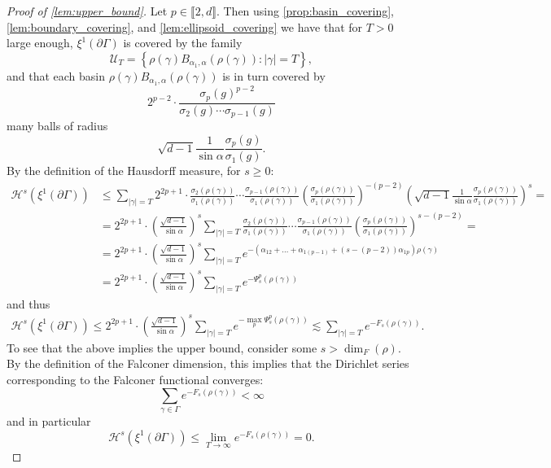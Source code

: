 \documentclass{report}
\begin{document}
\begin{proof}[Proof of \cref{lem:upper_bound}]
Let $p \in \llbracket 2, d \rrbracket$.
Then using \cref{prop:basin_covering}, \cref{lem:boundary_covering}, and \cref{lem:ellipsoid_covering} we have that for $T>0$ large enough, $\xi^1(\partial \Gamma)$ is covered by the family
\[
    \mathcal U_T = \left\{ \rho(\gamma) B_{\alpha_1, \alpha}(\rho(\gamma)) : |\gamma| = T \right\},
\]
and that each basin $\rho(\gamma) B_{\alpha_1, \alpha}(\rho(\gamma))$ is in turn covered by
\[
    2^{p-2} \cdot \frac{\sigma_p(g)^{p-2}}{\sigma_2(g) \cdots \sigma_{p-1}(g)}
\]
many balls of radius
\[
    \sqrt{d-1} \frac{1}{\sin \alpha} \frac{\sigma_p(g)}{\sigma_1(g)}.
\]
By the definition of the Hausdorff measure, for $s \geq 0$:
\begin{align*}
    \mathcal H^s(\xi^1(\partial \Gamma)) &\leq
    \sum_{|\gamma| = T}
        2^{2p+1} \cdot 
        \frac{\sigma_2(\rho(\gamma))}{\sigma_1(\rho(\gamma))} \cdots 
            \frac{\sigma_{p-1}(\rho(\gamma))}{\sigma_1(\rho(\gamma))}
        \left(
            \frac{\sigma_p(\rho(\gamma))}{\sigma_1(\rho(\gamma))}
        \right)^{-(p-2)}
        \left(
            \sqrt{d-1} \frac{1}{\sin \alpha} \frac{\sigma_p(\rho(\gamma))}{\sigma_1(\rho(\gamma))}
        \right)^s =\\
        &=
        2^{2p+1} \cdot \left( \frac{\sqrt{d-1}}{\sin \alpha}\right)^s  
        \sum_{|\gamma| = T} 
        \frac{\sigma_2(\rho(\gamma))}{\sigma_1(\rho(\gamma))} \cdots 
            \frac{\sigma_{p-1}(\rho(\gamma))}{\sigma_1(\rho(\gamma))}
        \left(
            \frac{\sigma_p(\rho(\gamma))}{\sigma_1(\rho(\gamma))}
        \right)^{s-(p-2)} =\\
        &=
        2^{2p+1} \cdot \left( \frac{\sqrt{d-1}}{\sin \alpha}\right)^s  
        \sum_{|\gamma| = T}
        e^{-\left( \alpha_{1 2} + \ldots + \alpha_{1 (p-1)} + (s - (p-2))\alpha_{1 p} \right)\rho(\gamma)}\\
        &=
        2^{2p+1} \cdot \left( \frac{\sqrt{d-1}}{\sin \alpha}\right)^s  
        \sum_{|\gamma| = T}
        e^{-\Psi_s^p(\rho(\gamma))}
\end{align*}
and thus
\begin{align*}
    \mathcal H^s(\xi^1(\partial \Gamma)) \leq
    2^{2p+1} \cdot \left( \frac{\sqrt{d-1}}{\sin \alpha}\right)^s
    \sum_{|\gamma| = T}
    e^{-\max_p \Psi_s^p(\rho(\gamma)) }\lesssim \sum_{|\gamma| = T} e^{-F_s(\rho(\gamma))}.
\end{align*}
To see that the above implies the upper bound, consider some $s > \dim_F(\rho)$.
By the definition of the Falconer dimension, this implies that the Dirichlet series corresponding to the Falconer functional converges:
\[
    \sum_{\gamma \in \Gamma} e^{-F_s(\rho(\gamma))} < \infty
\]
and in particular
\[
    \mathcal H^s(\xi^1(\partial \Gamma)) \leq 
    \lim_{T \to \infty} e^{-F_s(\rho(\gamma))} = 0.
\]
\end{proof}
\end{document}
